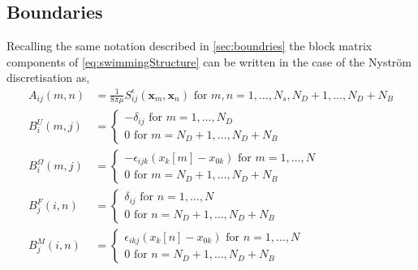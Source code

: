 \subsection{Boundaries}
Recalling the same notation described in \cref{sec:boundries} the block matrix components of \cref{eq:swimmingStructure} can be written in the case of the Nyström discretisation as,
\begin{align*}
A_{ij}(m,n) &= \frac{1}{8\pi\mu} S_{ij}^\epsilon (\bm{x}_m,\bm{x}_{n}) \text { for } m,n = 1,\dots,N_s,N_D+1,\dots,N_D+N_B \\
B_{i}^{U}(m,j) &= \begin{cases} -\delta_{ij} \text { for } m = 1,\dots,N_D \\ 0 \text { for } m = N_D+1,\dots,N_D+N_B\end{cases} \\
B_{i}^{\Omega}(m,j) &= \begin{cases} -\epsilon_{ijk}(x_k[m]-x_{0k}) \text { for } m = 1,\dots,N \\ 0 \text { for } m = N_D+1,\dots,N_D+N_B\end{cases} \\
B_{j}^{F}(i,n) &= \begin{cases} \delta_{ij} \text { for } n = 1,\dots,N \\ 0 \text { for } n = N_D+1,\dots,N_D+N_B\end{cases} \\
B_{j}^{M}(i,n) &= \begin{cases} \epsilon_{ikj} (x_k[n]-x_{0 k}) \text { for } n = 1,\dots,N \\ 0 \text { for } n = N_D+1,\dots,N_D+N_B\end{cases}
\end{align*}

